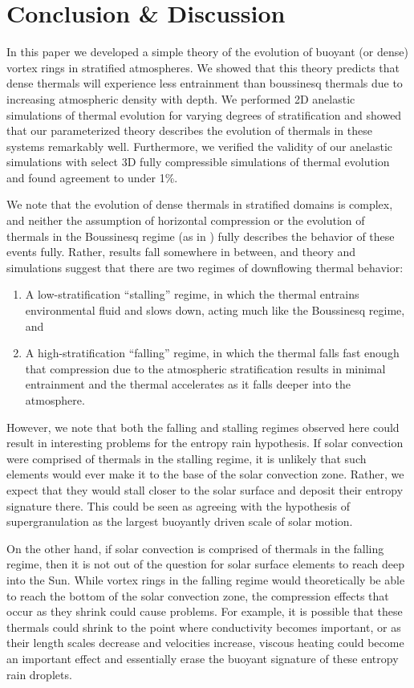 \documentclass[twocolumn, amsmath, amsfonts, amssymb, trackchanges]{aastex62}
\newcommand{\LJ}{\citetalias{lecoanet&jeevanjee2018}}
\begin{document}
\section{Conclusion \& Discussion}
\label{sec:discussion}
In this paper we developed a simple theory of the evolution of buoyant (or dense) vortex rings in stratified atmospheres.
We showed that this theory predicts that dense thermals will experience less entrainment than boussinesq thermals due to increasing atmospheric density with depth.
We performed 2D anelastic simulations of thermal evolution for varying degrees of stratification and showed that our parameterized theory describes the evolution of thermals in these systems remarkably well.
Furthermore, we verified the validity of our anelastic simulations with select 3D fully compressible simulations of thermal evolution and found agreement to under 1\%.

We note that the evolution of dense thermals in stratified domains is complex, and neither the assumption of horizontal compression \citep[as in e.g.][]{brandenburg2016} or the evolution of thermals in the Boussinesq regime (as in \LJ) fully describes the behavior of these events fully.
Rather, results fall somewhere in between, and theory and simulations suggest that there are two regimes of downflowing thermal behavior:
\begin{enumerate}
\item A low-stratification ``stalling'' regime, in which the thermal entrains environmental fluid and slows down, acting much like the Boussinesq regime, and
\item A high-stratification ``falling'' regime, in which the thermal falls fast enough that compression due to the atmospheric stratification results in minimal entrainment and the thermal accelerates as it falls deeper into the atmosphere.
\end{enumerate}

However, we note that both the falling and stalling regimes observed here could result in interesting problems for the entropy rain hypothesis. 
If solar convection were comprised of thermals in the stalling regime, it is unlikely that such elements would ever make it to the base of the solar convection zone.
Rather, we expect that they would stall closer to the solar surface and deposit their entropy signature there. 
This could be seen as agreeing with the hypothesis of supergranulation as the largest buoyantly driven scale of solar motion.

On the other hand, if solar convection is comprised of thermals in the falling regime, then it is not out of the question for solar surface elements to reach deep into the Sun.
While vortex rings in the falling regime would theoretically be able to reach the bottom of the solar convection zone, the compression effects that occur as they shrink could cause problems.
For example, it is possible that these thermals could shrink to the point where conductivity becomes important, or as their length scales decrease and velocities increase, viscous heating could become an important effect and essentially erase the buoyant signature of these entropy rain droplets.
\end{document}
